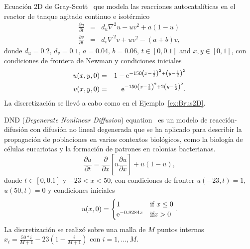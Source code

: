 \begin{example}\label{ex:GS2D}
    Ecuación 2D de Gray-Scott~\cite{gray1984autocatalytic,tokman2012new} que modela las reacciones autocatalíticas en el reactor de tanque agitado continuo e isotérmico
    \begin{eqnarray*}
        \frac{\partial u}{\partial t} &=& d_u\nabla^{2}u -uv^{2}+a(1-u) \\
        \frac{\partial v}{\partial t} &=& d_v\nabla^{2}v +uv^{2}-(a+b)v,
    \end{eqnarray*}
    donde $d_u=0\mathord{.}2,\,d_v=0\mathord{.}1,\,a=0\mathord{.}04,\,b=0\mathord{.}06$, $t\in[0, 0\mathord{.}1]$ and $x,y\in[0,1]$, con condiciones de frontera de Newman y condiciones iniciales
    \begin{eqnarray*}
        u(x,y,0) & = & 1-\mathrm{e}^{-150\left(x-\frac{1}{2}\right)^{2}+\left(y-\frac{1}{2}\right)^{2}}\\
        v(x,y,0) & = & \mathrm{e}^{-150\left(x-\frac{1}{2}\right)^{2}+2\left(y-\frac{1}{2}\right)^{2}}.
    \end{eqnarray*}
    La discretización se llevó a cabo como en el Ejemplo~\ref{ex:Brus2D}.
\end{example}

\begin{example}
    DND (\emph{Degenerate Nonlinear Diffusion}) equation~\cite{sherratt2010form,tokman2013comparative} es un modelo de reacción-difusión con difusión no lineal degenerada que se ha aplicado para describir la propagación de poblaciones en varios contextos biológicos, como la biología de células eucariotas y la formación de patrones en colonias bacterianas.
    \[ \frac{\partial u}{\partial t} = \frac{\partial}{\partial x}\left[ u\frac{\partial u}{\partial x} \right] + u(1-u), \]
    donde $t\in[0, 0\mathord{.}1]$ y $-23 < x < 50$, con condiciones de fronter $u(-23,t) = 1$, $u(50,t)=0$ y condiciones iniciales
    \[ u(x,0)=\begin{cases}
    1 & \text{if }x\leq 0\\
    \mathrm{e}^{-0\mathord{.}8284x} & \text{if}x>0
    \end{cases}. \]
    La discretización se realizó sobre una malla de $M$ puntos internos $x_i=\frac{50*i}{M+1}-23\left(1-\frac{i}{M+1}\right)$ con $i=1,\ldots,M$.
\end{example}


